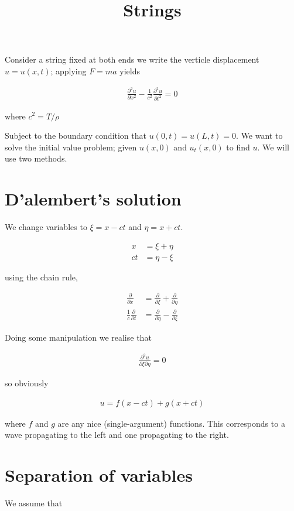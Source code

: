 \documentclass{article}
\title{Strings}
\date{}
\begin{document}
Consider a string fixed at both ends we write the verticle displacement $u = u(x,t)$; applying $F=ma$ yields

\begin{align}
\frac{\partial^2 u}{\partial x^2} - \frac{1}{c^2} \frac{\partial^2 u}{\partial t^2} = 0
\end{align}

where $c^2 = T/\rho$

Subject to the boundary condition that $u(0,t) = u(L,t) = 0$. We want to solve the initial value problem; given $u(x,0)$ and $u_t(x,0)$ to find $u$. We will use two methods.

\section{D'alembert's solution}

We change variables to $\xi = x - ct$ and $\eta = x + ct$. 

\begin{align}
x &= \xi + \eta \\
ct &= \eta - \xi
\end{align}

using the chain rule,

\begin{align}
\frac{\partial}{\partial x} &= \frac{\partial}{\partial \xi} + \frac{\partial}{\partial \eta} \\
\frac{1}{c}\frac{\partial}{\partial t} &= \frac{\partial}{\partial \eta} - \frac{\partial}{\partial \xi}
\end{align}

Doing some manipulation we realise that

\begin{align}
\frac{\partial^2 u}{\partial\xi\partial\eta} = 0
\end{align}

so obviously

\begin{align}
u = f(x - ct) + g(x + ct)
\end{align}

where $f$ and $g$ are any nice (single-argument) functions. This corresponds to a wave propagating to the left and one propagating to the right.

\section{Separation of variables}

We assume that 
\end{document}
